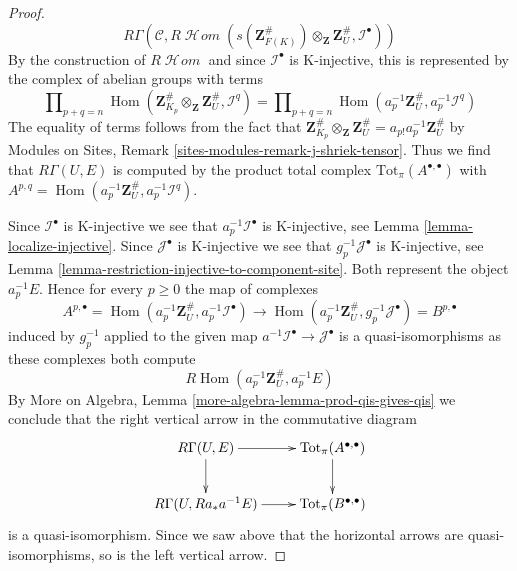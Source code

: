 \documentclass{stacks-project}
\theoremstyle{plain}
\theoremstyle{definition}
\theoremstyle{remark}
\numberwithin{equation}{subsection}
\def\Hom{\mathop{\mathrm{Hom}}\nolimits}
\def\SheafHom{\mathop{\mathcal{H}\!\mathit{om}}\nolimits}
\begin{document}
\begin{proof}
$$
R\Gamma(\mathcal{C}, R\SheafHom(
s(\mathbf{Z}_{F(K)}^\#) \otimes_\mathbf{Z} \mathbf{Z}_U^\#,
\mathcal{I}^\bullet))
$$
By the construction of $R\SheafHom$ and since $\mathcal{I}^\bullet$
is K-injective, this is represented by the complex of abelian groups
with terms
$$
\prod\nolimits_{p + q = n}
\Hom(\mathbf{Z}^\#_{K_p} \otimes_\mathbf{Z} \mathbf{Z}_U^\#, \mathcal{I}^q)
=
\prod\nolimits_{p + q = n}
\Hom(a_p^{-1}\mathbf{Z}_U^\#, a_p^{-1}\mathcal{I}^q)
$$
The equality of terms follows from the fact that
$\mathbf{Z}^\#_{K_p} \otimes_\mathbf{Z} \mathbf{Z}_U^\# =
a_{p!}a_p^{-1}\mathbf{Z}_U^\#$ by Modules on Sites,
Remark \ref{sites-modules-remark-j-shriek-tensor}.
Thus we find that $R\Gamma(U, E)$ is computed by
the product total complex $\text{Tot}_\pi(A^{\bullet, \bullet})$
with $A^{p, q} = \Hom(a_p^{-1}\mathbf{Z}_U^\#, a_p^{-1}\mathcal{I}^q)$.

\medskip\noindent
Since $\mathcal{I}^\bullet$ is K-injective we see that
$a_p^{-1}\mathcal{I}^\bullet$ is K-injective, see
Lemma \ref{lemma-localize-injective}.
Since $\mathcal{J}^\bullet$ is K-injective we see that
$g_p^{-1}\mathcal{J}^\bullet$ is K-injective, see
Lemma \ref{lemma-restriction-injective-to-component-site}.
Both represent the object $a_p^{-1}E$.
Hence for every $p \geq 0$ the map of complexes
$$
A^{p, \bullet} = \Hom(a_p^{-1}\mathbf{Z}_U^\#, a_p^{-1}\mathcal{I}^\bullet)
\longrightarrow
\Hom(a_p^{-1}\mathbf{Z}_U^\#, g_p^{-1}\mathcal{J}^\bullet) = B^{p, \bullet}
$$
induced by $g_p^{-1}$ applied to the given map
$a^{-1}\mathcal{I}^\bullet \to \mathcal{J}^\bullet$
is a quasi-isomorphisms as these complexes both compute
$$
R\Hom(a_p^{-1}\mathbf{Z}_U^\#, a_p^{-1}E)
$$
By More on Algebra, Lemma \ref{more-algebra-lemma-prod-qis-gives-qis}
we conclude that the right vertical arrow in the commutative diagram
$$
\xymatrix{
R\Gamma(U, E) \ar[r] \ar[d] &
\text{Tot}_\pi(A^{\bullet, \bullet}) \ar[d] \\
R\Gamma(U, Ra_*a^{-1}E) \ar[r] &
\text{Tot}_\pi(B^{\bullet, \bullet})
}
$$
is a quasi-isomorphism. Since we saw above that the horizontal arrows
are quasi-isomorphisms, so is the left vertical arrow.
\end{proof}
\end{document}
